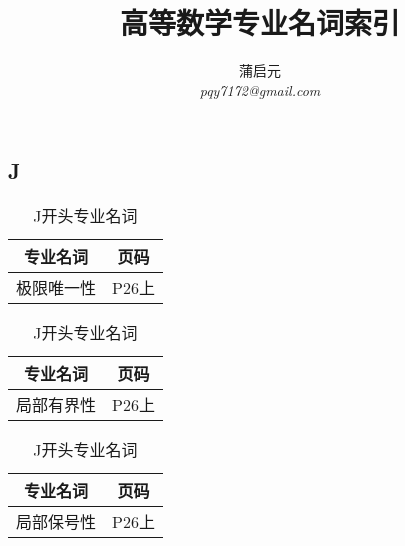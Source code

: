\documentclass{wx672article}
\title{高等数学专业名词索引}
\author{蒲启元 \\
 \emph{pqy7172@gmail.com}}
\begin{document}
\maketitle{}

\begin{center}
  \section*{J}
\end{center}
\label{sec:j}


 \begin{table}[h!] %
      \centering
        \begin{tabular}[t]{c|c} %
          \hline
          专业名词 &  页码   \\
          \hline
          极限唯一性 & P26上 \\
          \hline
        \end{tabular}
        \hfill
        \begin{tabular}[t]{c|c}
          \hline
          专业名词  &  页码  \\
          \hline
          局部有界性 & P26上 \\
          \hline
        \end{tabular}
        \hfill
        \begin{tabular}[t]{c|c}
          \hline
          专业名词 &  页码 \\
          \hline
          局部保号性 & P26上 \\
          \hline
        \end{tabular}
      \caption{J开头专业名词}\label{tabJ}
    \end{table}
\end{document}
